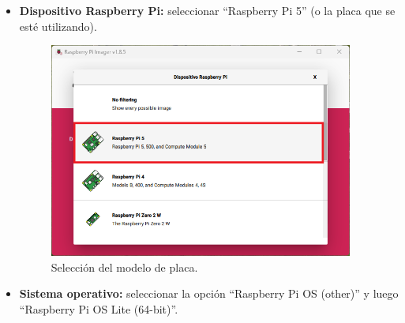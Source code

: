 \documentclass[12pt]{article}
\begin{document}
\begin{itemize}
    \item \textbf{Dispositivo Raspberry Pi:} seleccionar ``Raspberry Pi 5'' (o la placa que se esté utilizando).

        \begin{figure}[H]
            \centering
            \includegraphics[width=10cm]{rpi_placa.png}
            \caption{Selección del modelo de placa.}
            \label{RPI_placa}
        \end{figure}

    \item \textbf{Sistema operativo:} seleccionar la opción ``Raspberry Pi OS (other)'' y luego ``Raspberry Pi OS Lite (64-bit)''.


\end{itemize}
\end{document}
